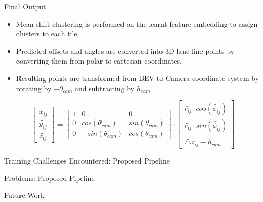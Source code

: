 \documentclass[aspectratio=169]{beamer}
\begin{document}
\begin{frame}{Final Output}
    \begin{itemize}
        \item Mean shift clustering is performed on the learnt feature embedding to assign clusters to each tile.
        \item Predicted offsets and angles are converted into 3D lane line points by converting them from polar to cartesian coordinates.
        \item Resulting points are transformed from BEV to Camera coordinate system by rotating by  $-\theta_{cam}$ and subtracting by $h_{cam}$
    \end{itemize}

    \begin{equation}
            \begin{bmatrix}\widetilde{x_{ij}}  \\\widetilde{y_{ij}} \\ \widetilde{z_{ij}}  \end{bmatrix} = \begin{bmatrix}1 & 0 & 0  \\ 0  & cos(\theta_{cam}) & sin(\theta_{cam}) \\ 0  & -sin(\theta_{cam}) & cos(\theta_{cam}) \end{bmatrix} \cdot \begin{bmatrix}\widetilde{r_{ij}} \cdot cos(\widetilde{\phi_{ij}})  \\\widetilde{r_{ij}} \cdot sin(\widetilde{\phi_{ij}})  \\ \widetilde{\triangle z_{ij}} - h_{cam} \end{bmatrix}
        \end{equation}
\end{frame}

\begin{frame}{Training Challenges Encountered: Proposed Pipeline }
    
\end{frame}

\begin{frame}{Problems: Proposed Pipeline}

    
\end{frame}

\begin{frame}{Future Work}
    
\end{frame}
\end{document}
